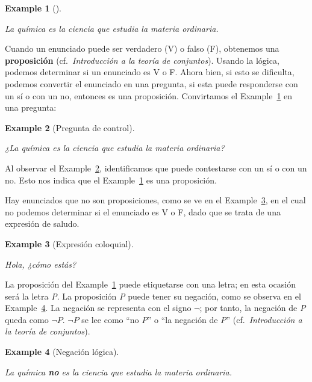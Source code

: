 \documentclass[
  letterpaper,
]{scrbook}
\theoremstyle{definition}
\newtheorem{example}{Example}[chapter]
\theoremstyle{remark}
\begin{document}
\begin{example}[]\protect\hypertarget{exm-quimica}{}\label{exm-quimica}

\emph{La química es la ciencia que estudia la materia ordinaria.}

\end{example}

Cuando un enunciado puede ser verdadero (V) o falso (F), obtenemos una
\textbf{proposición} (cf.~\emph{Introducción a la teoría de conjuntos}).
Usando la lógica, podemos determinar si un enunciado es V o F. Ahora
bien, si esto se dificulta, podemos convertir el enunciado en una
pregunta, si esta puede responderse con un sí o con un no, entonces es
una proposición. Convirtamos el Example~\ref{exm-quimica} en una
pregunta:

\begin{example}[Pregunta de
control]\protect\hypertarget{exm-quimica-pregunta}{}\label{exm-quimica-pregunta}

\emph{¿La química es la ciencia que estudia la materia ordinaria?}

\end{example}

Al observar el Example~\ref{exm-quimica-pregunta}, identificamos que
puede contestarse con un sí o con un no. Esto nos indica que el
Example~\ref{exm-quimica} es una proposición.

Hay enunciados que no son proposiciones, como se ve en el
Example~\ref{exm-saludo}, en el cual no podemos determinar si el
enunciado es V o F, dado que se trata de una expresión de saludo.

\begin{example}[Expresión
coloquial]\protect\hypertarget{exm-saludo}{}\label{exm-saludo}

\emph{Hola, ¿cómo estás?}

\end{example}

La proposición del Example~\ref{exm-quimica} puede etiquetarse con una
letra; en esta ocasión será la letra \emph{P}. La proposición \emph{P}
puede tener su negación, como se observa en el
Example~\ref{exm-quimica-negacion}. La negación se representa con el
signo \(\neg\); por tanto, la negación de \emph{P} queda como
\(\neg P\). \(\neg P\) se lee como ``no \emph{P}'' o ``la negación de
\emph{P}'' (cf.~\emph{Introducción a la teoría de conjuntos}).

\begin{example}[Negación
lógica]\protect\hypertarget{exm-quimica-negacion}{}\label{exm-quimica-negacion}

\emph{La química \textbf{no} es la ciencia que estudia la materia
ordinaria.}

\end{example}
\end{document}
